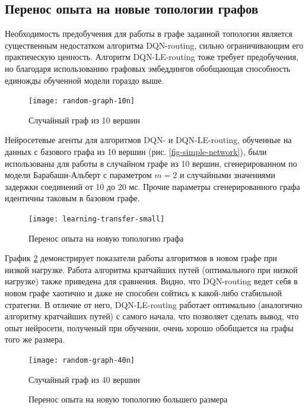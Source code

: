 \documentclass[specification,annotation,times]{itmo-student-thesis}
\theoremstyle{definition}
\begin{document}
\subsection{Перенос опыта на новые топологии графов}

Необходимость предобучения для работы в графе заданной топологии является
существенным недостатком алгоритма DQN-routing, сильно ограничивающим его
практическую ценность. Алгоритм DQN-LE-routing тоже требует предобучения, но
благодаря использованию графовых эмбеддингов обобщающая способность единожды
обученной модели гораздо выше.

\begin{figure}[!h]
  \caption{Случайный граф из 10 вершин}\label{fig-random-net-10n}
  \centering
  \texttt{[image: random-graph-10n]}
\end{figure}

Нейросетевые агенты для алгоритмов DQN- и DQN-LE-routing, обученные на данных с
базового графа из 10 вершин (рис. \ref{fig-simple-network}), были использованы
для работы в случайном графе из 10 вершин, сгенерированном по модели
Барабаши-Альберт с параметром $m = 2$ и случайными значениями задержки
соединений от 10 до 20 мс. Прочие параметры сгенерированного графа идентичны
таковым в базовом графе. 

\begin{figure}[!h]
  \caption{Перенос опыта на новую топологию графа}\label{experiments:network:transfer-small}
  \centering
  \texttt{[image: learning-transfer-small]}
\end{figure}

График \ref{experiments:network:transfer-small} демонстрирует показатели работы
алгоритмов в новом графе при низкой нагрузке. Работа алгоритма кратчайших
путей (оптимального при низкой нагрузке) также приведена для сравнения. Видно,
что DQN-routing ведет себя в новом графе хаотично и даже не способен сойтись к
какой-либо стабильной стратегии. В отличие от него, DQN-LE-routing работает
оптимально (аналогично алгоритму кратчайших путей) с самого начала, что
позволяет сделать вывод, что опыт нейросети, полученый при обучении, очень
хорошо обобщается на графы того же размера.

\begin{figure}[!h]
  \caption{Случайный граф из 40 вершин}\label{fig-random-net-40n}
  \centering
  \texttt{[image: random-graph-40n]}
\end{figure}

\begin{figure}[!h]
  \centering
  \hfil
  \caption{Перенос опыта на новую топологию большего размера}\label{experiments:network:transfer-big}
\end{figure}
\end{document}
